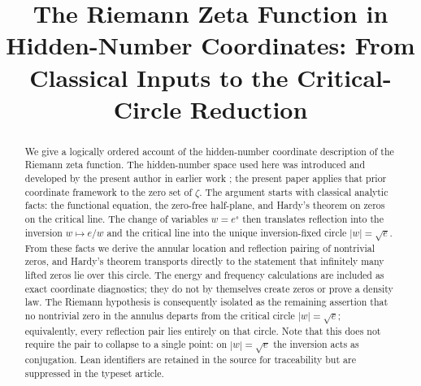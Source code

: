 \documentclass[submission,noinfoline]{jsfds}
\begin{document}
\begin{frontmatter}

\title{The Riemann Zeta Function in Hidden-Number Coordinates:
From Classical Inputs to the Critical-Circle Reduction}

\begin{aug}
\end{aug}

\begin{abstract}
We give a logically ordered account of the hidden-number coordinate
description of the Riemann zeta function. The hidden-number space used here
was introduced and developed by the present author in earlier work
\citep{LiuXu2026bridge}; the present paper applies that prior coordinate
framework to the zero set of $\zeta$. The argument starts with classical
analytic facts: the functional equation, the zero-free half-plane, and
Hardy's theorem on zeros on the critical line. The change of variables
$w=e^s$ then translates reflection into the inversion $w\mapsto e/w$ and
the critical line into the unique inversion-fixed circle
$|w|=\sqrt e$. From these facts we derive the annular location and reflection
pairing of nontrivial zeros, and Hardy's theorem transports directly to the
statement that infinitely many lifted zeros lie over this circle. The energy and
frequency calculations are included as exact coordinate diagnostics; they do
not by themselves create zeros or prove a density law. The Riemann hypothesis
is consequently isolated as the remaining assertion that no nontrivial zero in
the annulus departs from the critical circle $|w|=\sqrt e$; equivalently, every
reflection pair lies entirely on that circle. Note that this does not require
the pair to collapse to a single point: on $|w|=\sqrt e$ the inversion acts as
conjugation. Lean identifiers are retained in the source
for traceability but are suppressed in the typeset article.
\end{abstract}

\begin{keywords}
\end{keywords}

\begin{AMSclass}
\end{AMSclass}
\end{frontmatter}
\end{document}
